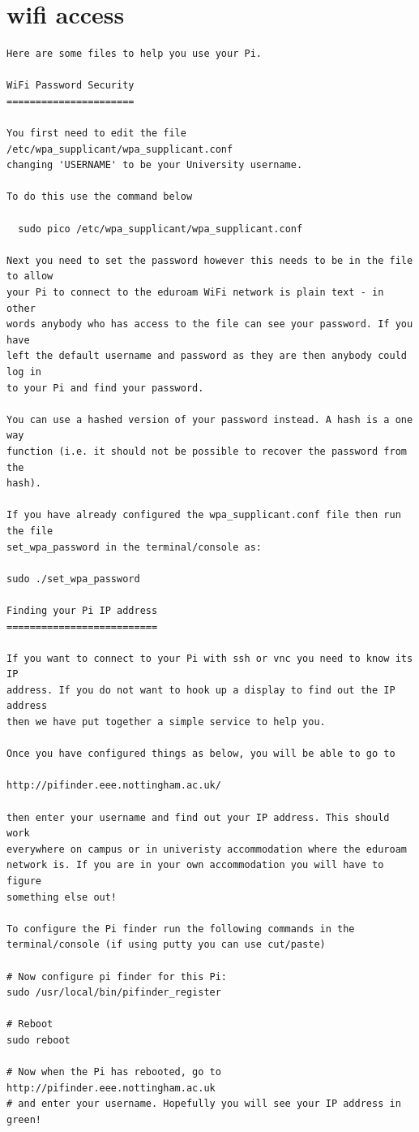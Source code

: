 	\section{wifi access}
\label{apx:wifi_instructions}
\begin{lstlisting}[caption={wifi access instructions}]
Here are some files to help you use your Pi.

WiFi Password Security
======================

You first need to edit the file /etc/wpa_supplicant/wpa_supplicant.conf
changing 'USERNAME' to be your University username.

To do this use the command below

  sudo pico /etc/wpa_supplicant/wpa_supplicant.conf

Next you need to set the password however this needs to be in the file to allow
your Pi to connect to the eduroam WiFi network is plain text - in other
words anybody who has access to the file can see your password. If you have
left the default username and password as they are then anybody could log in
to your Pi and find your password.

You can use a hashed version of your password instead. A hash is a one way
function (i.e. it should not be possible to recover the password from the
hash).

If you have already configured the wpa_supplicant.conf file then run the file
set_wpa_password in the terminal/console as:

sudo ./set_wpa_password

Finding your Pi IP address
==========================

If you want to connect to your Pi with ssh or vnc you need to know its IP
address. If you do not want to hook up a display to find out the IP address
then we have put together a simple service to help you.

Once you have configured things as below, you will be able to go to

http://pifinder.eee.nottingham.ac.uk/

then enter your username and find out your IP address. This should work
everywhere on campus or in univeristy accommodation where the eduroam
network is. If you are in your own accommodation you will have to figure
something else out!

To configure the Pi finder run the following commands in the
terminal/console (if using putty you can use cut/paste)

# Now configure pi finder for this Pi:
sudo /usr/local/bin/pifinder_register

# Reboot
sudo reboot

# Now when the Pi has rebooted, go to http://pifinder.eee.nottingham.ac.uk
# and enter your username. Hopefully you will see your IP address in green!
\end{lstlisting}		
		
